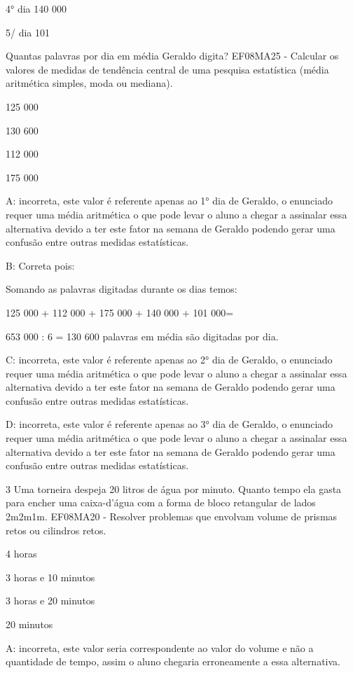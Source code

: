 4° dia 140 000

5/ dia 101

Quantas palavras por dia em média Geraldo digita? EF08MA25 - Calcular os
valores de medidas de tendência central de uma pesquisa estatística
(média aritmética simples, moda ou mediana).

\item 125 000
\item 130 600
\item 112 000
\item 175 000

A: incorreta, este valor é referente apenas ao 1° dia de Geraldo, o
enunciado requer uma média aritmética o que pode levar o aluno a chegar
a assinalar essa alternativa devido a ter este fator na semana de
Geraldo podendo gerar uma confusão entre outras medidas estatísticas.

B: Correta pois:

Somando as palavras digitadas durante os dias temos:

125 000 + 112 000 + 175 000 + 140 000 + 101 000=

653 000 : 6 = 130 600 palavras em média são digitadas por dia.

C: incorreta, este valor é referente apenas ao 2° dia de Geraldo, o
enunciado requer uma média aritmética o que pode levar o aluno a chegar
a assinalar essa alternativa devido a ter este fator na semana de
Geraldo podendo gerar uma confusão entre outras medidas estatísticas.

D: incorreta, este valor é referente apenas ao 3° dia de Geraldo, o
enunciado requer uma média aritmética o que pode levar o aluno a chegar
a assinalar essa alternativa devido a ter este fator na semana de
Geraldo podendo gerar uma confusão entre outras medidas estatísticas.

\num{3} Uma torneira despeja 20 litros de água por minuto. Quanto tempo ela
gasta para encher uma caixa-d'água com a forma de bloco retangular de
lados 2m\times 2m\times 1m. EF08MA20 - Resolver problemas que envolvam volume de
prismas retos ou cilindros retos.

\item 4 horas
\item 3 horas e 10 minutos
\item 3 horas e 20 minutos
\item 20 minutos

A: incorreta, este valor seria correspondente ao valor do volume e não a
quantidade de tempo, assim o aluno chegaria erroneamente a essa
alternativa.


